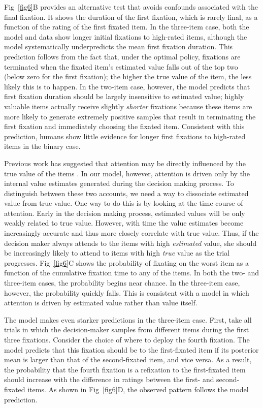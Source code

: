 Fig~\ref{fig6}B provides an alternative test that avoids confounds associated with the final fixation. It shows the duration of the first fixation, which is rarely final, as a function of the rating of the first fixated item. In the three-item case, both the model and data show longer initial fixations to high-rated items, although the model systematically underpredicts the mean first fixation duration. This prediction follows from the fact that, under the optimal policy, fixations are terminated when the fixated item's estimated value falls out of the top two (below zero for the first fixation); the higher the true value of the item, the less likely this is to happen. In the two-item case, however, the model predicts that first fixation duration should be largely insensitive to estimated value; highly valuable items actually receive slightly \emph{shorter} fixations because these items are more likely to generate extremely positive samples that result in terminating the first fixation and immediately choosing the fixated item. Consistent with this prediction, humans show little evidence for longer first fixations to high-rated items in the binary case.

Previous work has suggested that attention may be directly influenced by the true value of the items \citep{towal2013simultaneous,anderson2016attention,gluth2018valuebaseda}. In our model, however, attention is driven only by the internal value estimates generated during the decision making process. To distinguish between these two accounts, we need a way to dissociate estimated value from true value. One way to do this is by looking at the time course of attention. Early in the decision making process, estimated values will be only weakly related to true value. However, with time the value estimates become increasingly accurate and thus more closely correlate with true value. Thus, if the decision maker always attends to the items with high \emph{estimated} value, she should be increasingly likely to attend to items with high \emph{true} value as the trial progresses. Fig~\ref{fig6}C shows the probability of fixating on the worst item as a function of the cumulative fixation time to any of the items. In both the two- and three-item cases, the probability begins near chance. In the three-item case, however, the probability quickly falls. This is consistent with a model in which attention is driven by estimated value rather than value itself.

The model makes even starker predictions in the three-item case. First, take all trials in which the decision-maker samples from different items during the first three fixations. Consider the choice of where to deploy the fourth fixation. The model predicts that this fixation should be to the first-fixated item if its posterior mean is larger than that of the second-fixated item, and vice versa. As a result, the probability that the fourth fixation is a refixation to the first-fixated item should increase with the difference in ratings between the first- and second-fixated items. As shown in Fig~\ref{fig6}D, the observed pattern follows the model prediction. 

